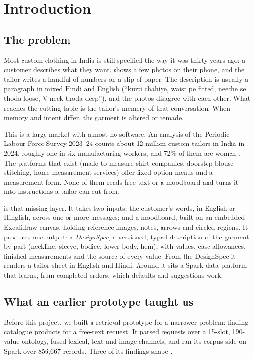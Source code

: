 \chapter{Introduction}

\section{The problem}

Most custom clothing in India is still specified the way it was thirty years ago: a customer describes what they want, shows a few photos on their phone, and the tailor writes a handful of numbers on a slip of paper. The description is usually a paragraph in mixed Hindi and English (``kurti chahiye, waist pe fitted, neeche se thoda loose, V neck thoda deep''), and the photos disagree with each other. What reaches the cutting table is the tailor's memory of that conversation. When memory and intent differ, the garment is altered or remade.

This is a large market with almost no software. An analysis of the Periodic Labour Force Survey 2023--24 counts about 12 million custom tailors in India in 2024, roughly one in six manufacturing workers, and 72\% of them are women \cite{dataforindia}. The platforms that exist (made-to-measure shirt companies, doorstep blouse stitching, home-measurement services) offer fixed option menus and a measurement form. None of them reads free text or a moodboard and turns it into instructions a tailor can cut from.

\sys{} is that missing layer. It takes two inputs: the customer's words, in English or Hinglish, across one or more messages; and a moodboard, built on an embedded Excalidraw canvas, holding reference images, notes, arrows and circled regions. It produces one output: a \emph{DesignSpec}, a versioned, typed description of the garment by part (neckline, sleeve, bodice, lower body, hem), with values, ease allowances, finished measurements and the source of every value. From the DesignSpec it renders a tailor sheet in English and Hindi. Around it sits a Spark data platform that learns, from completed orders, which defaults and suggestions work.

\section{What an earlier prototype taught us}

Before this project, we built a retrieval prototype for a narrower problem: finding catalogue products for a free-text request. It parsed requests over a 15-slot, 190-value ontology, fused lexical, text and image channels, and ran its corpus side on Spark over 856,667 records. Three of its findings shape \sys{}.

